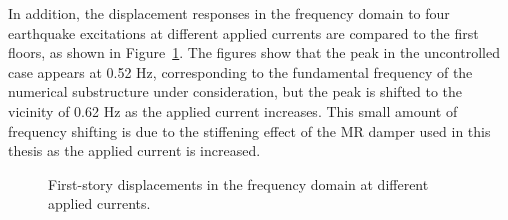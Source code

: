 In addition, the displacement responses in the frequency domain to four earthquake excitations at different applied currents are compared to the first floors, as shown in Figure~\ref{fig:8-18}. The figures show that the peak in the uncontrolled case appears at 0.52 Hz, corresponding to the fundamental frequency of the numerical substructure under consideration, but the peak is shifted to the vicinity of 0.62 Hz as the applied current increases. This small amount of frequency shifting is due to the stiffening effect of the MR damper used in this thesis as the applied current is increased.

\begin{figure}[H]
\centering
{}
\caption{First-story displacements in the frequency domain at different applied currents.}
\label{fig:8-18}
\end{figure}

